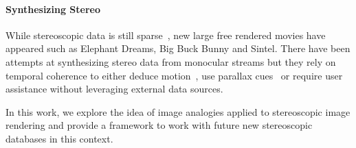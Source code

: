 \paragraph{Synthesizing Stereo}
While stereoscopic data is still sparse~\cite{Corrigan10, Smolic10}, new large free rendered movies have appeared such as Elephant Dreams, Big Buck Bunny and Sintel.
There have been attempts at synthesizing stereo data from monocular streams but they rely on temporal coherence to either deduce motion~\cite{Moustakas05}, use parallax cues~\cite{Zhang07} or require user assistance \cite{Wang11} without leveraging external data sources.

In this work, we explore the idea of image analogies applied to stereoscopic image rendering and provide a framework to work with future new stereoscopic databases in this context.